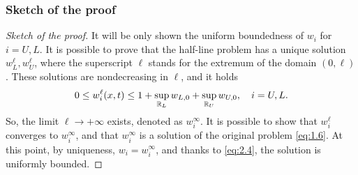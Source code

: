 
\begin{frame}
    \frametitle{Sketch of the proof}
    \begin{proof}[Sketch of the proof]
        It will be only shown the uniform boundedness of \(w_i\) for \(i = U, L\).
        It is possible to prove that the half-line problem has a unique solution \(w_L^\ell, w_{U}^\ell\), where the superscript \(\ell\) stands for the extremum of the domain \((0, \ell)\). 
        These solutions are nondecreasing in \(\ell\), and it holds 
        \begin{equation}
            0 \leq w_i^\ell(x,t) \leq 1 + \sup_{\mathbb{R}_L} w_{L,0} + \sup_{\mathbb{R}_{U}} w_{U,0}, \quad i = U, L.
            \label{eq:2.4}
        \end{equation}
        So, the limit \(\ell \to +\infty\) exists, denoted as \(w_i^\infty\).
        It is possible to show that \(w_i^\ell\) converges to \(w_i^\infty\), and that \(w_i^\infty\) is a solution of the original problem \ref{eq:1.6}. 
        At this point, by uniqueness, \(w_i = w_i^\infty\), and thanks to \eqref{eq:2.4}, the solution is uniformly bounded.
    \end{proof}
\end{frame}

        
    